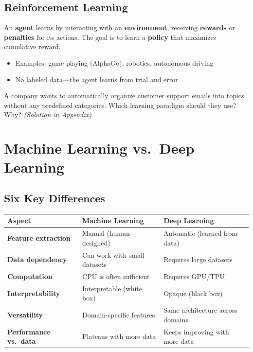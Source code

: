 \documentclass[11pt,a4paper]{article}
\begin{document}
\subsection{Reinforcement Learning}

An \textbf{agent} learns by interacting with an \textbf{environment}, receiving \textbf{rewards} or \textbf{penalties} for its actions. The goal is to learn a \textbf{policy} that maximizes cumulative reward.

\begin{itemize}[leftmargin=1.5em]
    \item Examples: game playing (AlphaGo), robotics, autonomous driving
    \item No labeled data---the agent learns from trial and error
\end{itemize}

\begin{tcolorbox}[questionbox={Self-Check Q1}]
A company wants to automatically organize customer support emails into topics without any predefined categories. Which learning paradigm should they use? Why? \textit{(Solution in Appendix)}
\end{tcolorbox}

\section{Machine Learning vs.\ Deep Learning}

\subsection{Six Key Differences}

\begin{center}
\renewcommand{\arraystretch}{1.4}
\begin{tabular}{@{}p{3.2cm}p{5.2cm}p{5.2cm}@{}}
\toprule
\textbf{Aspect} & \textbf{Machine Learning} & \textbf{Deep Learning} \\
\midrule
\textbf{Feature extraction} & Manual (human-designed) & Automatic (learned from data) \\
\textbf{Data dependency} & Can work with small datasets & Requires large datasets \\
\textbf{Computation} & CPU is often sufficient & Requires GPU/TPU \\
\textbf{Interpretability} & Interpretable (white box) & Opaque (black box) \\
\textbf{Versatility} & Domain-specific features & Same architecture across domains \\
\textbf{Performance vs.\ data} & Plateaus with more data & Keeps improving with more data \\
\bottomrule
\end{tabular}
\end{center}
\end{document}
